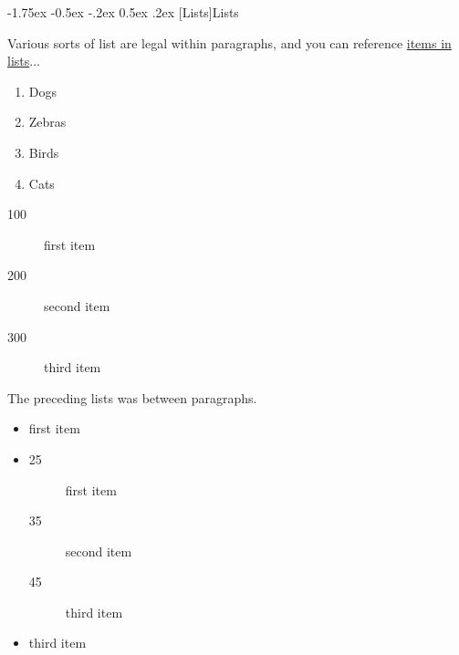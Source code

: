 \documentclass[11pt,twoside]{article}\makeatletter
\makeatletter
\renewcommand\section{\@startsection {section}{1}{\z@}%
     {-1.75ex \@plus -0.5ex \@minus -.2ex}%
     {0.5ex \@plus .2ex}%
     {\reset@font\Large\bfseries\sffamily}}
\makeatother
\begin{document}
\section[Lists]{Lists}\label{P1}\par
Various sorts of list are legal within paragraphs, and you can reference \hyperlink{birds}{items in lists}... \begin{enumerate}
\item Dogs
\item Zebras
\item \hypertarget{birds}{}Birds
\item Cats
\end{enumerate}\begin{description}

\item[100]first item 
\item[200]second item 
\item[300]third item 
\end{description} \par
The preceding lists was between paragraphs.\par
{} \begin{itemize}
\item first item 
\item \begin{description}

\item[25]first item 
\item[35]second item 
\item[45]third item 
\end{description} 
\item third item 
\end{itemize} 
\end{document}
